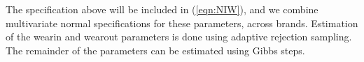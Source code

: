 \documentclass[11pt]{article} %
\begin{document}
The specification above will be included in (\ref{eqn:NIW}), and we combine multivariate normal specifications
for these parameters, across brands.  Estimation of the wearin and wearout parameters is done using adaptive rejection
sampling.    The remainder of the parameters can be estimated using Gibbs steps.  
\end{document}
